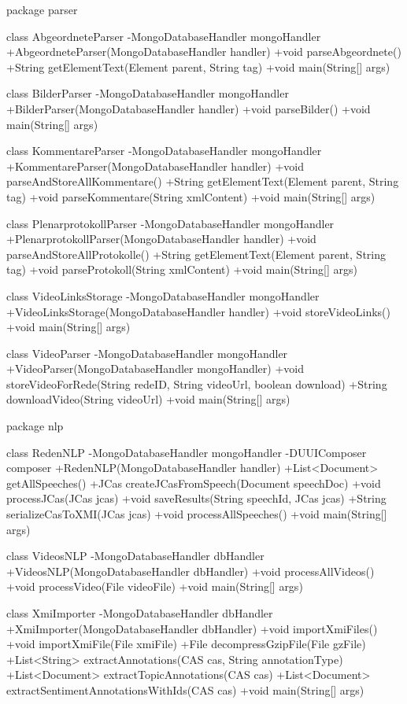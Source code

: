 package parser {

  class AbgeordneteParser {
    -MongoDatabaseHandler mongoHandler
    +AbgeordneteParser(MongoDatabaseHandler handler)
    +void parseAbgeordnete()
    +String getElementText(Element parent, String tag)
    +void main(String[] args)
  }

  class BilderParser {
    -MongoDatabaseHandler mongoHandler
    +BilderParser(MongoDatabaseHandler handler)
    +void parseBilder()
    +void main(String[] args)
  }

  class KommentareParser {
    -MongoDatabaseHandler mongoHandler
    +KommentareParser(MongoDatabaseHandler handler)
    +void parseAndStoreAllKommentare()
    +String getElementText(Element parent, String tag)
    +void parseKommentare(String xmlContent)
    +void main(String[] args)
  }

  class PlenarprotokollParser {
    -MongoDatabaseHandler mongoHandler
    +PlenarprotokollParser(MongoDatabaseHandler handler)
    +void parseAndStoreAllProtokolle()
    +String getElementText(Element parent, String tag)
    +void parseProtokoll(String xmlContent)
    +void main(String[] args)
  }

  class VideoLinksStorage {
    -MongoDatabaseHandler mongoHandler
    +VideoLinksStorage(MongoDatabaseHandler handler)
    +void storeVideoLinks()
    +void main(String[] args)
  }

  class VideoParser {
    -MongoDatabaseHandler mongoHandler
    +VideoParser(MongoDatabaseHandler mongoHandler)
    +void storeVideoForRede(String redeID, String videoUrl, boolean download)
    +String downloadVideo(String videoUrl)
    +void main(String[] args)
  }

}

package nlp {

  class RedenNLP {
    -MongoDatabaseHandler mongoHandler
    -DUUIComposer composer
    +RedenNLP(MongoDatabaseHandler handler)
    +List<Document> getAllSpeeches()
    +JCas createJCasFromSpeech(Document speechDoc)
    +void processJCas(JCas jcas)
    +void saveResults(String speechId, JCas jcas)
    +String serializeCasToXMI(JCas jcas)
    +void processAllSpeeches()
    +void main(String[] args)
  }

  class VideosNLP {
    -MongoDatabaseHandler dbHandler
    +VideosNLP(MongoDatabaseHandler dbHandler)
    +void processAllVideos()
    +void processVideo(File videoFile)
    +void main(String[] args)
  }

  class XmiImporter {
    -MongoDatabaseHandler dbHandler
    +XmiImporter(MongoDatabaseHandler dbHandler)
    +void importXmiFiles()
    +void importXmiFile(File xmiFile)
    +File decompressGzipFile(File gzFile)
    +List<String> extractAnnotations(CAS cas, String annotationType)
    +List<Document> extractTopicAnnotations(CAS cas)
    +List<Document> extractSentimentAnnotationsWithIds(CAS cas)
    +void main(String[] args)
  }

}

